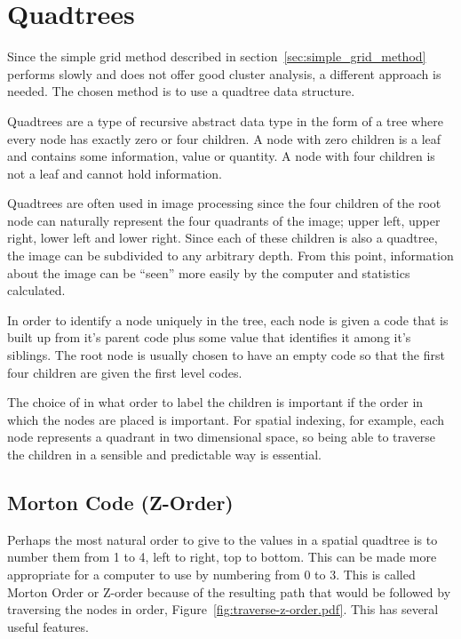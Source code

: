 
\section{Quadtrees}
\label{sec:quadtrees}

Since the simple grid method described in section~\ref{sec:simple_grid_method}
performs slowly and does not offer good cluster analysis, a different approach
is needed. The chosen method is to use a quadtree data structure.

Quadtrees are a type of recursive abstract data type in the form of a tree
where every node has exactly zero or four children. A node with zero children
is a leaf and contains some information, value or quantity. A node with four
children is not a leaf and cannot hold information.

Quadtrees are often used in image processing since the four children of the
root node can naturally represent the four quadrants of the image; upper left,
upper right, lower left and lower right. Since each of these children is also a
quadtree, the image can be subdivided to any arbitrary depth. From this point,
information about the image can be ``seen'' more easily by the computer and
statistics calculated.

In order to identify a node uniquely in the tree, each node is given a code
that is built up from it's parent code plus some value that identifies it
among it's siblings. The root node is usually chosen to have an empty code so
that the first four children are given the first level codes.

The choice of in what order to label the children is important if the order
in which the nodes are placed is important. For spatial indexing, for example,
each node represents a quadrant in two dimensional space, so being able to
traverse the children in a sensible and predictable way is essential.

\subsection[Morton Code]{Morton Code (Z-Order)}
\label{sub:morton_code_z_order_}

Perhaps the most natural order to give to the values in a spatial quadtree is
to number them from 1 to 4, left to right, top to bottom. This can be made
more appropriate for a computer to use by numbering from 0 to 3. This is
called Morton Order\cite{mortoncomputer} or Z-order because of the resulting
path that would be followed by traversing the nodes in order,
Figure~\ref{fig:traverse-z-order.pdf}. This has several useful features.

